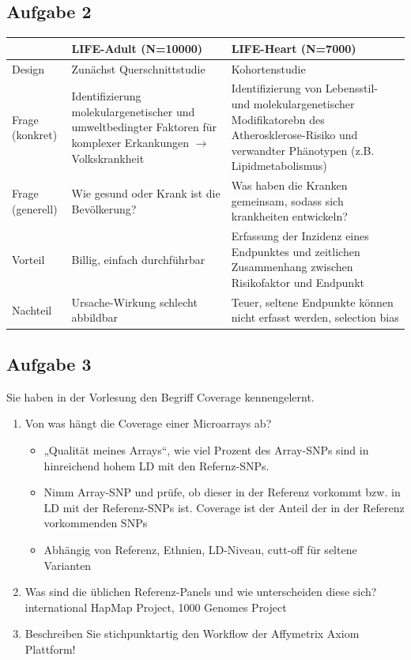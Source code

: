 \documentclass[13pt,a4paper]{article}
\begin{document}
\subsection{Aufgabe 2}
\begin{tabularx}{\textwidth}{|p{}|p{}|p{}|}
\hline
& LIFE-Adult (N=10000) & LIFE-Heart (N=7000) \\
\hline
Design & Zunächst Querschnittstudie & Kohortenstudie \\
\hline
Frage (konkret) & Identifizierung molekulargenetischer und umweltbedingter Faktoren für komplexer Erkankungen $\rightarrow$ Volkskrankheit & Identifizierung von Lebensstil- und molekulargenetischer Modifikatorebn des Atherosklerose-Risiko und verwandter Phänotypen (z.B. Lipidmetabolismus) \\
\hline
Frage (generell) & Wie gesund oder Krank ist die Bevölkerung? & Was haben die Kranken gemeinsam, sodass sich krankheiten entwickeln? \\
\hline
Vorteil & Billig, einfach durchführbar & Erfassung der Inzidenz eines Endpunktes und zeitlichen Zusammenhang zwischen Risikofaktor und Endpunkt \\
\hline
Nachteil & Ursache-Wirkung schlecht abbildbar & Teuer, seltene Endpunkte können nicht erfasst werden, selection bias\\
\hline
\end{tabularx}


\subsection{Aufgabe 3}
Sie haben in der Vorlesung den Begriff Coverage kennengelernt.\\
\begin{enumerate}
	\item Von was hängt die Coverage einer Microarrays ab?
	\begin{itemize}
		\item „Qualität meines Arrays“, wie viel Prozent des Array-SNPs sind in hinreichend hohem LD mit den Refernz-SNPs.
		\item Nimm Array-SNP und prüfe, ob dieser in der Referenz vorkommt bzw. in LD mit der Referenz-SNPs ist. Coverage ist der Anteil der in der Referenz vorkommenden SNPs
		\item Abhängig von Referenz, Ethnien, LD-Niveau, cutt-off für seltene Varianten
	\end{itemize}
	\item Was sind die üblichen Referenz-Panels und wie unterscheiden diese sich? 
international HapMap Project, 1000 Genomes Project
	\item Beschreiben Sie stichpunktartig den Workflow der Affymetrix Axiom Plattform!
\end{enumerate}
\end{document}
